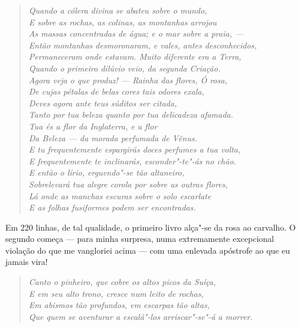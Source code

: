 {{{{{{{{{{{{{{{{{{\begin{verse}
\textit{Quando a cólera divina se abateu sobre o mundo,\\
E sobre as rochas, as colinas, as montanhas arrojou\\
As massas concentradas de água; e o mar sobre a praia, ---\\
Então montanhas desmoronaram, e vales, antes desconhecidos,\\
Permaneceram onde estavam. Muito diferente era a Terra,\\
Quando o primeiro dilúvio veio, da segunda Criação.\\
Agora veja o que produz! --- Rainha das flores, Ó rosa,\\
De cujas pétalas de belas cores tais odores exala,\\
Deves agora ante teus súditos ser citada,\\
Tanto por tua beleza quanto por tua delicadeza afamada.\\
Tua és a flor da Inglaterra, e a flor\\
Da Beleza --- da morada perfumada de Vênus.\\
E tu frequentemente espargirás doces perfumes a tua volta,\\
E frequentemente te inclinarás, esconder"-te"-ás no chão.\footnotemark\\
E então o lírio, erguendo"-se tão altaneiro,\\
Sobrelevará tua alegre corola por sobre as outras flores,\\
Lá onde as manchas escuras sobre o solo escarlate\\
E as folhas fusiformes podem ser encontradas.}
\end{verse}

Em 220 linhas, de tal qualidade, o primeiro livro alça"-se da rosa ao
carvalho. O segundo começa --- para minha surpresa, numa extremamente
excepcional violação do que me vangloriei acima --- com uma enlevada
apóstrofe ao que eu jamais vira!

\begin{verse}
\textit{Canto o pinheiro, que cobre os altos picos da Suíça\footnotemark,\\
E em seu alto trono, cresce num leito de rochas,\\
Em abismos tão profundos, em escarpas tão altas,\\
Que quem se aventurar a escalá"-los arriscar"-se"-á a morrer.}
\end{verse}

}}}}}}}}}}}}}}}}}}
